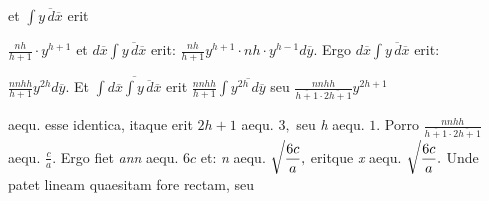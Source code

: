 %
et
$\displaystyle\!\!\int\!\!\overline{y\,d\overline{x}}$
erit\rule[0mm]{0pt}{5,0mm}
$\displaystyle\frac{nh}{h+1}\cdot y^{h+1}$
et
$\displaystyle d\overline{x}\!\!\int\!\!\overline{y\,d\overline{x}}$
erit:%
$\displaystyle\frac{nh}{h+1}y^{h+1}\cdot nh\cdot y^{h-1}d\overline{y}.$
Ergo $\displaystyle d\overline{x}\!\!\int\!\!\overline{y\,d\overline{x}}$
erit:\rule[0mm]{0pt}{5,0mm}
$\displaystyle\frac{nnhh}{h+1}y^{2h}d\overline{y}.$
Et
$\displaystyle\!\!\int\!\!\overline{d\overline{x}\!\!\int\!\!\overline{y\,d\overline{x}}}$
erit
%
$\displaystyle\frac{nnhh}{h+1}\!\!\int\!\!\overline{y^{2h}\,d\overline{y}}$
seu %
$\displaystyle\frac{nnhh}{\overline{h+1} \cdot \overline{2h+1}}y^{2h+1}$%
\protect\rule[0mm]{0pt}{6mm}aequ.
%
esse identica,
itaque erit
$2h+1$ aequ. $3,$ seu \textit{h} aequ. $1.$
Porro
$\displaystyle\frac{nnhh}{\overline{h+1} \cdot \overline{2h+1}}$
aequ. %
$\displaystyle\frac{c}{a}.$
Ergo fiet \textit{ann} aequ. $6c$
%
et:
\pend
\newpage%
\pstart
\noindent \textit{n} aequ. $\displaystyle\sqrt{\protect\vphantom{\protect\mathstrut{\frac{6c}{a}}}}\frac{6c}{a},$
eritque
%
\textit{x} aequ. $\displaystyle\sqrt{\protect\vphantom{\protect\mathstrut{\frac{6c}{a}}}}\frac{6c}{a}.$
Unde patet %
lineam quaesitam\protect{} fore rectam,
seu\rule[0mm]{0pt}{5,0mm}
